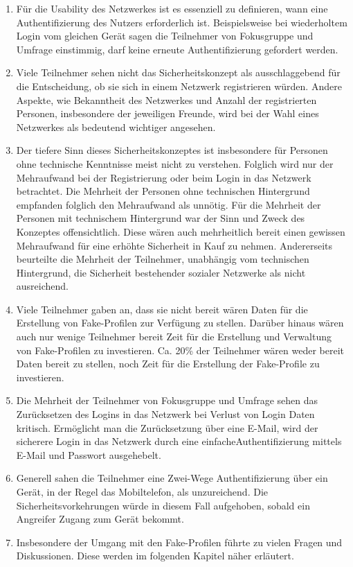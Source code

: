 \documentclass{sigchi}
\begin{document}
\begin{enumerate}
	\item Für die Usability des Netzwerkes ist es essenziell zu definieren, wann eine Authentifizierung des Nutzers erforderlich ist. Beispielsweise bei wiederholtem Login vom gleichen Gerät sagen die Teilnehmer von Fokusgruppe und Umfrage einstimmig, darf keine erneute Authentifizierung gefordert werden. 
	\item Viele Teilnehmer sehen nicht das Sicherheitskonzept als ausschlaggebend für die Entscheidung, ob sie sich in einem Netzwerk registrieren würden. Andere Aspekte, wie Bekanntheit des Netzwerkes und Anzahl der registrierten Personen, insbesondere der jeweiligen Freunde, wird bei der Wahl eines Netzwerkes als bedeutend wichtiger angesehen.
	\item Der tiefere Sinn dieses Sicherheitskonzeptes ist insbesondere für Personen ohne technische Kenntnisse meist nicht zu verstehen. Folglich wird nur der Mehraufwand bei der Registrierung oder beim Login in das Netzwerk betrachtet. Die Mehrheit der Personen ohne technischen Hintergrund empfanden folglich den Mehraufwand als unnötig. Für die Mehrheit der Personen mit technischem Hintergrund war der Sinn und Zweck des Konzeptes offensichtlich. Diese wären auch mehrheitlich bereit einen gewissen Mehraufwand für eine erhöhte Sicherheit in Kauf zu nehmen. Andererseits beurteilte die Mehrheit der Teilnehmer, unabhängig vom technischen Hintergrund, die Sicherheit bestehender sozialer Netzwerke als nicht ausreichend.
	\item Viele Teilnehmer gaben an, dass sie nicht bereit wären Daten für die Erstellung von Fake-Profilen zur Verfügung zu stellen. Darüber hinaus wären auch nur wenige Teilnehmer bereit Zeit für die Erstellung und Verwaltung von Fake-Profilen zu investieren. Ca. 20\% der Teilnehmer wären weder bereit Daten bereit zu stellen, noch Zeit für die Erstellung der Fake-Profile zu investieren.
	\item Die Mehrheit der Teilnehmer von Fokusgruppe und Umfrage sehen das Zurücksetzen des Logins in das Netzwerk bei Verlust von Login Daten kritisch. Ermöglicht man die Zurücksetzung über eine E-Mail, wird der sicherere Login in das Netzwerk durch eine \glqq einfache\grqq Authentifizierung mittels E-Mail und Passwort ausgehebelt.
	\item Generell sahen die Teilnehmer eine Zwei-Wege Authentifizierung über ein Gerät, in der Regel das Mobiltelefon, als unzureichend. Die Sicherheitsvorkehrungen würde in diesem Fall aufgehoben, sobald ein Angreifer Zugang zum Gerät bekommt.
	\item Insbesondere der Umgang mit den Fake-Profilen führte zu vielen Fragen und Diskussionen. Diese werden im folgenden Kapitel näher erläutert.
\end{enumerate}
\end{document}
